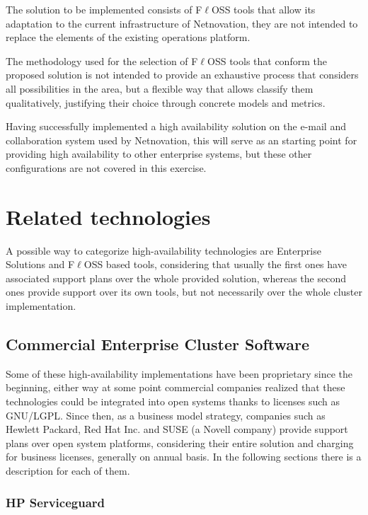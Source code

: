 \documentclass[a4paper, 12pt]{book}
\begin{document}
The solution to be implemented consists of F$\ell$OSS tools that allow its adaptation to the current infrastructure of Netnovation, they are not intended to replace the elements of the existing operations  platform.\bigskip

\noindent The methodology used for the selection of F$\ell$OSS tools that conform the proposed solution is not intended to provide an exhaustive process that considers all possibilities in the area, but a flexible way that allows classify them qualitatively, justifying their choice through concrete models and metrics.\bigskip

\noindent Having successfully implemented a high availability solution on the e-mail and collaboration system used by Netnovation, this will serve as an starting point for providing high availability to other enterprise systems, but these other configurations are not covered in this exercise.\bigskip


%
\chapter{Related technologies}
\label{chap:related}
A possible way to categorize high-availability technologies are Enterprise Solutions and F$\ell$OSS based tools, considering that usually the first ones have associated support plans over the whole provided solution, whereas the second ones provide support over its own tools, but not necessarily over the whole cluster implementation.

\section{Commercial Enterprise Cluster Software}
\label{sec:enterprise}

Some of these high-availability implementations have been proprietary since the beginning, either way at some point commercial companies realized that these technologies could be integrated into open systems thanks to licenses such as GNU/LGPL. Since then, as a business model strategy, companies such as Hewlett Packard, Red Hat Inc. and SUSE (a Novell company) provide support plans over open system platforms, considering their entire solution and charging for business licenses, generally on annual basis. In the following sections there is a description for each of them.

\subsection{HP Serviceguard}
\label{subsec:serviceguard}
\end{document}
